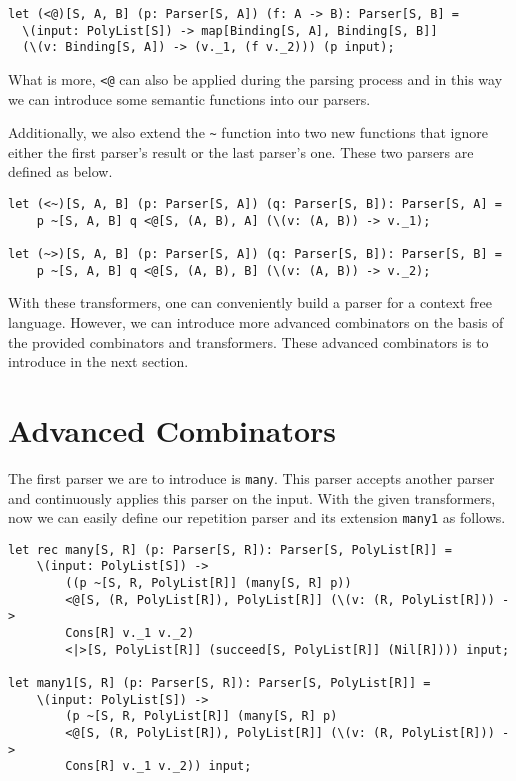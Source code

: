 \begin{lstlisting}
let (<@)[S, A, B] (p: Parser[S, A]) (f: A -> B): Parser[S, B] =
  \(input: PolyList[S]) -> map[Binding[S, A], Binding[S, B]]
  (\(v: Binding[S, A]) -> (v._1, (f v._2))) (p input);
\end{lstlisting}

What is more, \texttt{<@} can also be applied during the parsing process and in this way we can introduce some semantic functions into our parsers.

Additionally, we also extend the \texttt{\textasciitilde} function into two new functions that ignore either the first parser's result or the last parser's one. These two parsers are defined as below.

\begin{lstlisting}
let (<~)[S, A, B] (p: Parser[S, A]) (q: Parser[S, B]): Parser[S, A] =
	p ~[S, A, B] q <@[S, (A, B), A] (\(v: (A, B)) -> v._1);

let (~>)[S, A, B] (p: Parser[S, A]) (q: Parser[S, B]): Parser[S, B] =
	p ~[S, A, B] q <@[S, (A, B), B] (\(v: (A, B)) -> v._2);
\end{lstlisting}

With these transformers, one can conveniently build a parser for a context free language. However, we can introduce more advanced combinators on the basis of the provided combinators and transformers. These advanced combinators is to introduce in the next section.

\section{Advanced Combinators}
The first parser we are to introduce is \texttt{many}. This parser accepts another parser and continuously applies this parser on the input. With the given transformers, now we can easily define our repetition parser and its extension \texttt{many1} as follows.

\begin{lstlisting}
let rec many[S, R] (p: Parser[S, R]): Parser[S, PolyList[R]] =
    \(input: PolyList[S]) ->
        ((p ~[S, R, PolyList[R]] (many[S, R] p))
        <@[S, (R, PolyList[R]), PolyList[R]] (\(v: (R, PolyList[R])) ->
        Cons[R] v._1 v._2)
        <|>[S, PolyList[R]] (succeed[S, PolyList[R]] (Nil[R]))) input;

let many1[S, R] (p: Parser[S, R]): Parser[S, PolyList[R]] =
    \(input: PolyList[S]) ->
        (p ~[S, R, PolyList[R]] (many[S, R] p)
        <@[S, (R, PolyList[R]), PolyList[R]] (\(v: (R, PolyList[R])) ->
        Cons[R] v._1 v._2)) input;
\end{lstlisting}

